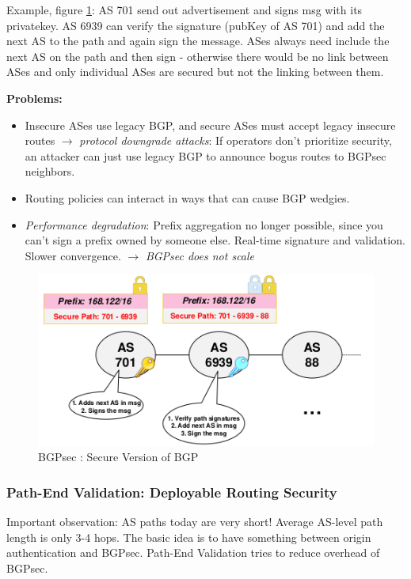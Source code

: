 \documentclass[11pt,oneside,a4paper]{article}
\begin{document}
\noindent Example, figure \ref{fig:bgpsec}: AS 701 send out advertisement and signs msg with its privatekey. AS 6939 can verify the signature (pubKey of AS 701) and add the next AS to the path and again sign the message. ASes always need include the next AS on the path and then sign - otherwise there would be no link between ASes and only individual ASes are secured but not the linking between them.

\noindent \textbf{Problems:}

\vspace{-\topsep}
\begin{itemize}
	\setlength{\itemsep}{0pt}
	\setlength{\parskip}{0pt}
	\item Insecure ASes use legacy BGP, and secure ASes must accept legacy insecure routes $\rightarrow$ \textit{protocol downgrade attacks}: If operators don’t prioritize security, an attacker can just use legacy BGP to announce bogus routes to BGPsec neighbors.
	\item Routing policies can interact in ways that can cause BGP wedgies.
	\item \textit{Performance degradation}: Prefix aggregation no longer possible, since you can't sign a prefix owned by someone else. Real-time signature and validation. Slower convergence.
	\subitem $\rightarrow$ \textit{BGPsec does not scale}
\end{itemize}
\vspace{-\topsep}

\begin{figure}
	\centering
	\includegraphics[width=0.5\linewidth]{figures/bgpsec}
	\caption{BGPsec : Secure Version of BGP}
	\label{fig:bgpsec}
\end{figure}

\subsubsection{Path-End Validation: Deployable Routing Security}

Important observation: AS paths today are very short! Average AS-level path length is only 3-4 hops. The basic idea is to have something between origin authentication and BGPsec. Path-End Validation tries to reduce overhead of BGPsec.\\
\end{document}
